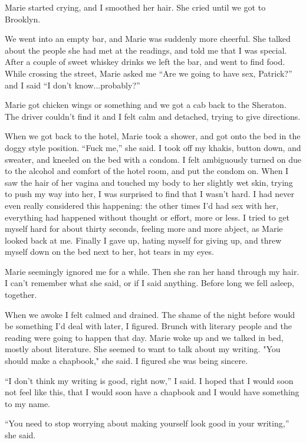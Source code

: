 \documentclass[12pt]{memoir}
\begin{document}
Marie started crying, and I smoothed her hair.  She cried until we got to
Brooklyn.

We went into an empty bar, and Marie was suddenly more cheerful.  She talked
about the people she had met at the readings, and told me that I was special.
After a couple of sweet whiskey drinks we left the bar, and went to find 
food.  While crossing the street, Marie asked me ``Are we going to have sex,
Patrick?'' and I said ``I don't know...probably?''

Marie got chicken wings or something and we got a cab back to the Sheraton.  The
driver couldn't find it and I felt calm and detached, trying to give directions.  

When we got back to the hotel, Marie took a shower, and got onto the bed in the
doggy style position.  ``Fuck me,'' she said.  I took off my khakis, button
down, and sweater, and kneeled on the bed with a condom.  I felt ambiguously
turned on due to the alcohol and comfort of the hotel room, and put the condom
on.  When I saw the hair of her vagina and touched my body to her slightly wet
skin, trying to push my way into her, I was surprised to find that I wasn't
hard.  I had never even really considered this happening: the other times I'd
had sex with her, everything had happened without thought or effort, more or
less.  I tried to get myself hard for about thirty seconds, feeling more and
more abject, as Marie looked back at me.  Finally I gave up, hating myself for
giving up, and threw myself down on the bed next to her, hot tears in my eyes.

Marie seemingly ignored me for a while. Then she ran her hand through my hair.
I can't remember what she said, or if I said anything.  Before long we fell
asleep, together.

When we awoke I felt calmed and drained.  The shame of the night before would be
something I'd deal with later, I figured.  Brunch with literary people and the
reading were going to happen that day.  Marie woke up and we talked in bed,
mostly about literature.  She seemed to want to talk about my writing.  "You
should make a chapbook," she said.  I figured she was being sincere.  

``I don't think my writing is good, right now,'' I said.  I hoped that I would
soon not feel like this, that I would soon have a chapbook and I would have
something to my name.

``You need to stop worrying about making yourself look good in your writing,'' she
said.
\end{document}
